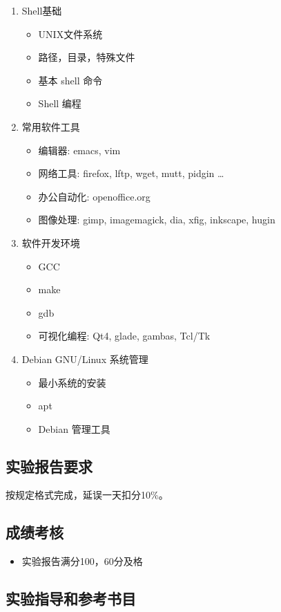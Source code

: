 \documentclass{wx672ctexart}
\begin{document}
\begin{enumerate}
\item Shell基础
  \begin{itemize}
  \item UNIX文件系统
  \item 路径，目录，特殊文件
  \item 基本 shell 命令
  \item Shell 编程
  \end{itemize}
\item 常用软件工具
  \begin{itemize}
  \item 编辑器: emacs, vim
  \item 网络工具: firefox, lftp, wget, mutt, pidgin \ldots{}
  \item 办公自动化: openoffice.org
  \item 图像处理: gimp, imagemagick, dia, xfig, inkscape, hugin
  \end{itemize}
\item 软件开发环境
  \begin{itemize}
  \item GCC
  \item make
  \item gdb
  \item 可视化编程: Qt4, glade, gambas, Tcl/Tk
  \end{itemize}
\item Debian GNU/Linux 系统管理
  \begin{itemize}
  \item 最小系统的安装
  \item apt
  \item Debian 管理工具
  \end{itemize}
\end{enumerate}

\subsection{实验报告要求}
按规定格式完成，延误一天扣分10\%。

\subsection{成绩考核}

\begin{itemize}
\item 实验报告满分100，60分及格
\end{itemize}

\subsection{实验指导和参考书目}
\end{document}
